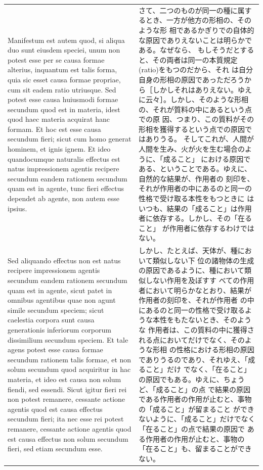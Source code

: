 \documentclass[paper=a4paper,fontsize=10pt,jafontsize=9pt,titlepage]{jlreq}
\begin{document}
\begin{longtable}{p{21em}p{21em}}
\\


Manifestum est autem
quod, si aliqua duo sunt eiusdem speciei, unum non potest esse per se
causa formae alterius, inquantum est talis forma, quia sic esset causa
formae propriae, cum sit eadem ratio utriusque. Sed potest esse causa
huiusmodi formae secundum quod est in materia, idest quod haec materia
acquirat hanc formam. Et hoc est esse causa secundum fieri; sicut cum
homo generat hominem, et ignis ignem. Et ideo quandocumque naturalis
effectus est natus impressionem agentis recipere secundum eandem
rationem secundum quam est in agente, tunc fieri effectus dependet ab
agente, non autem esse ipsius.

&

さて、二つのものが同一の種に属するとき、一方が他方の形相の、そのような形
 相であるかぎりでの自体的な原因でありえないことは明らかである。なぜなら、
 もしそうだとすると、その両者は同一の本質規定(ratio)をもつのだから、それ
 は自分自身の形相の原因であっただろうから［しかしそれはありえない。ゆえ
 に云々］。しかし、そのような形相の、それが質料の中にあるという点での原
 因、つまり、この質料がその形相を獲得するという点での原因ではありうる。
 そしてこれが、人間が人間を生み、火が火を生む場合のように、「成ること」
 における原因である、ということである。ゆえに、自然的な結果が、作用者の
 刻印を、それが作用者の中にあるのと同一の性格で受け取る本性をもつときに
 はいつも、結果の「成ること」は作用者に依存する。しかし、その「在ること」
 が作用者に依存するわけではない。


\\


Sed aliquando effectus non est natus
recipere impressionem agentis secundum eandem rationem secundum quam est
in agente, sicut patet in omnibus agentibus quae non agunt simile
secundum speciem; sicut caelestia corpora sunt causa generationis
inferiorum corporum dissimilium secundum speciem. Et tale agens potest
esse causa formae secundum rationem talis formae, et non solum secundum
quod acquiritur in hac materia, et ideo est causa non solum fiendi, sed
essendi. Sicut igitur fieri rei non potest remanere, cessante actione
agentis quod est causa effectus secundum fieri; ita nec esse rei potest
remanere, cessante actione agentis quod est causa effectus non solum
secundum fieri, sed etiam secundum esse.


&

しかし、たとえば、天体が、種において類似しない下
 位の諸物体の生成の原因であるように、種において類似しない作用を及ぼすす
 べての作用者において明らかなとおり、結果が作用者の刻印を、それが作用者
 の中にあるのと同一の性格で受け取るような本性をもたないとき、そのような
 作用者は、この質料の中に獲得される点においてだけでなく、そのような形相
 の性格における形相の原因でありうるのであり、それゆえ、「成ること」だけ
 でなく、「在ること」の原因でもある。ゆえに、ちょうど、「成ること」の点
 で結果の原因である作用者の作用が止むと、事物の「成ること」が留まること
 ができないように、「成ること」だけでなく「在ること」の点で結果の原因で
 ある作用者の作用が止むと、事物の「在ること」も、留まることができない。


\end{longtable}
\end{document}
